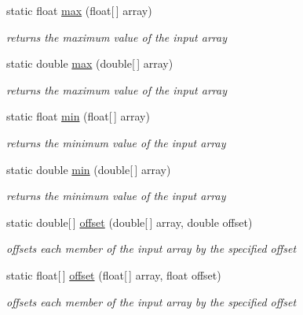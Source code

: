 \begin{DoxyCompactItemize}
\item 
static float \hyperlink{classuk_1_1ac_1_1dmu_1_1iesd_1_1cascade_1_1util_1_1_array_utils_ad634422f957bcb7bca9b71ca2df80bdc}{max} (float\mbox{[}$\,$\mbox{]} array)
\begin{DoxyCompactList}\small\item\em returns the maximum value of the input array \end{DoxyCompactList}\item 
static double \hyperlink{classuk_1_1ac_1_1dmu_1_1iesd_1_1cascade_1_1util_1_1_array_utils_ac6b0c16dc79a5ca5df790d6a2f3ce280}{max} (double\mbox{[}$\,$\mbox{]} array)
\begin{DoxyCompactList}\small\item\em returns the maximum value of the input array \end{DoxyCompactList}\item 
static float \hyperlink{classuk_1_1ac_1_1dmu_1_1iesd_1_1cascade_1_1util_1_1_array_utils_a1ea1dceabae3a8cd56c5d1e5cad32bc9}{min} (float\mbox{[}$\,$\mbox{]} array)
\begin{DoxyCompactList}\small\item\em returns the minimum value of the input array \end{DoxyCompactList}\item 
static double \hyperlink{classuk_1_1ac_1_1dmu_1_1iesd_1_1cascade_1_1util_1_1_array_utils_ae28cfd55f0cd717a8cccbae16ce051e8}{min} (double\mbox{[}$\,$\mbox{]} array)
\begin{DoxyCompactList}\small\item\em returns the minimum value of the input array \end{DoxyCompactList}\item 
static double\mbox{[}$\,$\mbox{]} \hyperlink{classuk_1_1ac_1_1dmu_1_1iesd_1_1cascade_1_1util_1_1_array_utils_a4e465741240b166c11f2f8f058577db5}{offset} (double\mbox{[}$\,$\mbox{]} array, double offset)
\begin{DoxyCompactList}\small\item\em offsets each member of the input array by the specified offset \end{DoxyCompactList}\item 
static float\mbox{[}$\,$\mbox{]} \hyperlink{classuk_1_1ac_1_1dmu_1_1iesd_1_1cascade_1_1util_1_1_array_utils_a7d8da36358cecf7fd0442eadda5c9ba0}{offset} (float\mbox{[}$\,$\mbox{]} array, float offset)
\begin{DoxyCompactList}\small\item\em offsets each member of the input array by the specified offset \end{DoxyCompactList}\item 

\end{DoxyCompactItemize}
